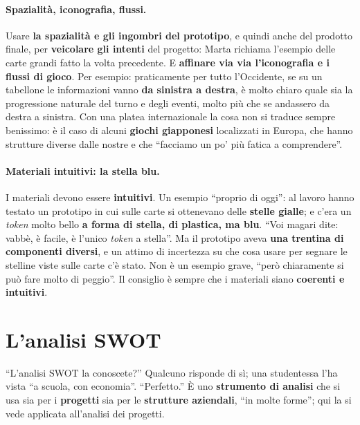 \paragraph{Spazialità, iconografia, flussi.} Usare \textbf{la spazialità e gli ingombri del
prototipo}, e quindi anche del prodotto finale, per \textbf{veicolare gli intenti} del
progetto: Marta richiama l'esempio delle carte grandi fatto la volta precedente. E
\textbf{affinare via via l'iconografia e i flussi di gioco}. Per esempio: praticamente per
tutto l'Occidente, se su un tabellone le informazioni vanno \textbf{da sinistra a destra},
è molto chiaro quale sia la progressione naturale del turno e degli eventi, molto più che se
andassero da destra a sinistra. Con una platea internazionale la cosa non si traduce sempre
benissimo: è il caso di alcuni \textbf{giochi giapponesi} localizzati in Europa, che hanno
strutture diverse dalle nostre e che ``facciamo un po' più fatica a comprendere''.

\paragraph{Materiali intuitivi: la stella blu.} I materiali devono essere
\textbf{intuitivi}. Un esempio ``proprio di oggi'': al lavoro hanno testato un prototipo in
cui sulle carte si ottenevano delle \textbf{stelle gialle}; e c'era un \emph{token} molto
bello \textbf{a forma di stella, di plastica, ma blu}. ``Voi magari dite: vabbè, è facile, è
l'unico \emph{token} a stella''. Ma il prototipo aveva \textbf{una trentina di componenti
diversi}, e un attimo di incertezza su che cosa usare per segnare le stelline viste sulle
carte c'è stato. Non è un esempio grave, ``però chiaramente si può fare molto di peggio''.
Il consiglio è sempre che i materiali siano \textbf{coerenti e intuitivi}.

\section{L'analisi SWOT}
\label{a14:sec:swot}



``L'analisi SWOT la conoscete?'' Qualcuno risponde di sì; una studentessa l'ha vista ``a
scuola, con economia''. ``Perfetto.'' È uno \textbf{strumento di analisi} che si usa sia per
i \textbf{progetti} sia per le \textbf{strutture aziendali}, ``in molte forme''; qui la si
vede applicata all'analisi dei progetti.

